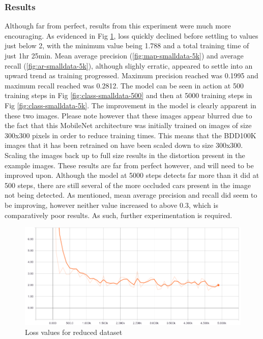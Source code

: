 \documentclass[12pt]{report}
\begin{document}
\subsubsection{Results}
\begin{flushleft}
Although far from perfect, results from this experiment were much more encouraging. As evidenced in Fig \ref{fig:loss-smalldata-5k}, loss quickly declined before settling to values just below 2, with the minimum value being 1.788 and a total training time of just 1hr 25min. Mean average precision (\ref{fig:map-smalldata-5k}) and average recall (\ref{fig:ar-smalldata-5k}), although slighly erratic, appeared to settle into an upward trend as training progressed. Maximum precision reached was 0.1995 and maximum recall reached was 0.2812. The model can be seen in action at 500 training steps in Fig \ref{fig:class-smalldata-500} and then at 5000 training steps in Fig \ref{fig:class-smalldata-5k}. The improvement in the model is clearly apparent in these two images. Please note however that these images appear blurred due to the fact that this MobileNet architecture was initially trained on images of size 300x300 pixels in order to reduce training times. This means that the BDD100K images that it has been retrained on have been scaled down to size 300x300. Scaling the images back up to full size results in the distortion present in the example images. These results are far from perfect however, and will need to be improved upon. Although the model at 5000 steps detects far more than it did at 500 steps, there are still several of the more occluded cars present in the image not being detected. As mentioned, mean average precision and recall did seem to be improving, however neither value increased to above 0.3, which is comparatively poor results. As such, further experimentation is required.
\end{flushleft}

\vspace{0.5cm}
\begin{figure}[ht!]
	\centering
	\includegraphics[width=12cm]{loss-smalldata-5k}
	\caption{Loss values for reduced dataset}
	\label{fig:loss-smalldata-5k}
\end{figure}
\end{document}
